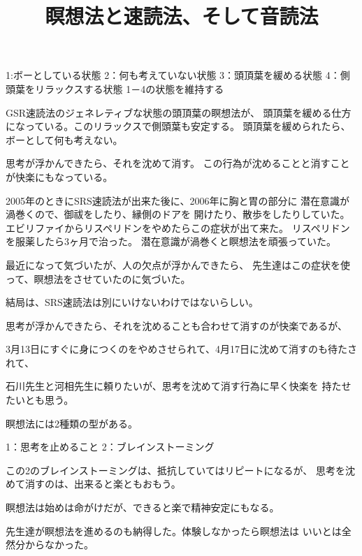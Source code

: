 \documentclass{jsarticle}
\begin{document}
\title{瞑想法と速読法、そして音読法}
\author{}
\date{}
\maketitle
  
 1:ボーとしている状態 
 2：何も考えていない状態
 3：頭頂葉を緩める状態
 4：側頭葉をリラックスする状態
 1－4の状態を維持する

 GSR速読法のジェネレティブな状態の頭頂葉の瞑想法が、
 頭頂葉を緩める仕方になっている。このリラックスで側頭葉も安定する。
 頭頂葉を緩められたら、ボーとして何も考えない。

 思考が浮かんできたら、それを沈めて消す。
 この行為が沈めることと消すことが快楽にもなっている。



 2005年のときにSRS速読法が出来た後に、2006年に胸と胃の部分に
 潜在意識が渦巻くので、御祓をしたり、縁側のドアを
 開けたり、散歩をしたりしていた。
 エビリファイからリスペリドンをやめたらこの症状が出て来た。
 リスペリドンを服薬したら3ヶ月で治った。
 潜在意識が渦巻くと瞑想法を頑張っていた。

 最近になって気づいたが、人の欠点が浮かんできたら、
 先生達はこの症状を使って、瞑想法をさせていたのに気づいた。

 結局は、SRS速読法は別にいけないわけではないらしい。

 思考が浮かんできたら、それを沈めることも合わせて消すのが快楽であるが、

 3月13日にすぐに身につくのをやめさせられて、4月17日に沈めて消すのも待たされて、

 石川先生と河相先生に頼りたいが、思考を沈めて消す行為に早く快楽を
 持たせたいとも思う。

 瞑想法には2種類の型がある。

 1：思考を止めること
 2：ブレインストーミング

 この2のブレインストーミングは、抵抗していてはリピートになるが、
 思考を沈めて消すのは、出来ると楽ともおもう。

 瞑想法は始めは命がけだが、できると楽で精神安定にもなる。

 先生達が瞑想法を進めるのも納得した。体験しなかったら瞑想法は
 いいとは全然分からなかった。
\end{document}
